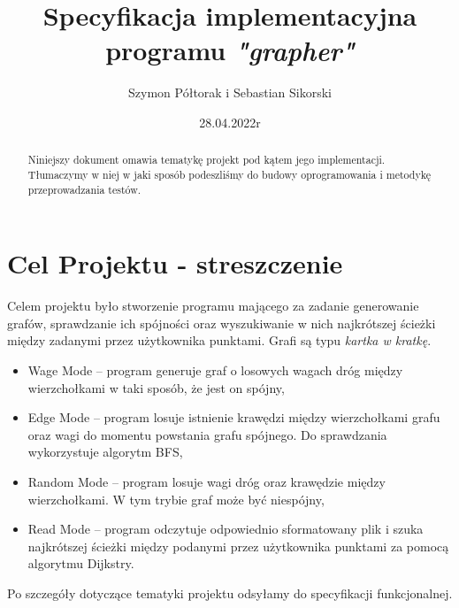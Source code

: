 \documentclass[10pt, a4paper]{report}
\title{\huge{\textbf{Specyfikacja implementacyjna} \\ programu \textit{"grapher"}}}
\author{Szymon Półtorak i Sebastian Sikorski}
\date{28.04.2022r}
\begin{document}
    \maketitle
    \renewcommand*\thesection{\arabic{section}}

    \begin{abstract}
      Niniejszy dokument omawia tematykę projekt pod kątem jego implementacji. Tłumaczymy w niej w jaki sposób podeszliśmy do budowy oprogramowania i
      metodykę przeprowadzania testów.
    \end{abstract}

    \pagestyle{fancy}
    \fancyhf{}
    
    \tableofcontents
    \newpage

    \section{Cel Projektu - streszczenie}
    Celem projektu było stworzenie programu mającego za zadanie generowanie grafów, sprawdzanie ich spójności oraz wyszukiwanie w nich najkrótszej ścieżki między zadanymi przez użytkownika punktami. 
    Grafi są typu \textit{kartka w kratkę}.

    \begin{itemize}
        \item Wage Mode – program generuje graf o losowych wagach dróg między wierzchołkami w taki sposób, że jest on spójny,
        \item Edge Mode – program losuje istnienie krawędzi między wierzchołkami grafu oraz wagi do momentu powstania 
        grafu spójnego. Do sprawdzania wykorzystuje algorytm BFS,
        \item Random Mode – program losuje wagi dróg oraz krawędzie między wierzchołkami. W tym trybie graf może być niespójny,
        \item Read Mode -- program odczytuje odpowiednio sformatowany plik i szuka najkrótszej ścieżki
        między podanymi przez użytkownika punktami za pomocą algorytmu Dijkstry.
    \end{itemize}
    Po szczegóły dotyczące tematyki projektu odsyłamy do specyfikacji funkcjonalnej.
\end{document}

